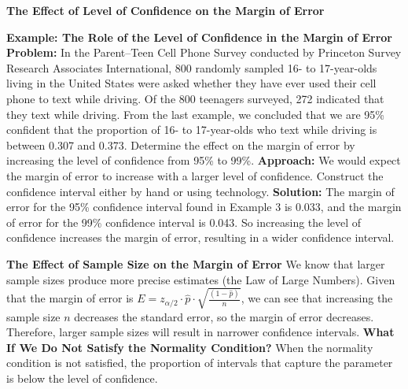 \documentclass{report}
\begin{document}
    \bigbreak \noindent \bigbreak \noindent 
      \textbf{The Effect of Level of Confidence on the Margin of Error}
      \bigbreak \noindent 
      \begin{mdframed}
          \textbf{Example: The Role of the Level of Confidence in the Margin of Error} 
          \bigbreak \noindent 
          \textbf{Problem:}
          In the Parent--Teen Cell Phone Survey conducted by Princeton Survey Research Associates International, 800 randomly sampled 16- to 17-year-olds living in the United States were asked whether they have ever used their cell phone to text while driving. Of the 800 teenagers surveyed, 272 indicated that they text while driving. From the last example, we concluded that we are 95\% confident that the proportion of 16- to 17-year-olds who text while driving is between 0.307 and 0.373. Determine the effect on the margin of error by increasing the level of confidence from 95\% to 99\%.
          \bigbreak \noindent 
          \textbf{Approach:}
          We would expect the margin of error to increase with a larger level of confidence. Construct the confidence interval either by hand or using technology.
          \bigbreak \noindent 
          \textbf{Solution:}
          \bigbreak \noindent 
          The margin of error for the 95\% confidence interval found in Example 3 is 0.033, and the margin of error for the 99\% confidence interval is 0.043. So increasing the level of confidence increases the margin of error, resulting in a wider confidence interval.
      \end{mdframed}
      \bigbreak \noindent \bigbreak \noindent 
      \textbf{The Effect of Sample Size on the Margin of Error}
      \bigbreak \noindent 
      We know that larger sample sizes produce more precise estimates (the Law of Large Numbers). Given that the margin of error is $E=z_{\alpha/2} \cdot \hat{p} \cdot \sqrt{\frac{(1-\hat{p})}{n}}$, we can see that increasing the sample size $n$ decreases the standard error, so the margin of error decreases. Therefore, larger sample sizes will result in narrower confidence intervals.
      \bigbreak \noindent 
      \textbf{What If We Do Not Satisfy the Normality Condition?}
      \bigbreak \noindent 
     When the normality condition is not satisfied, the proportion of intervals that capture the parameter is below the level of confidence.
\end{document}
